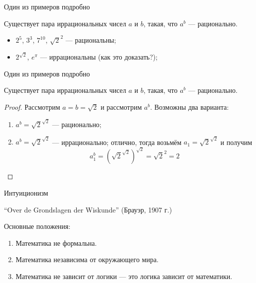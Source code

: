 \documentclass[aspectratio=169]{beamer}
\begin{document}
\begin{frame}{Один из примеров подробно}
\begin{thmrus}Существует пара иррациональных чисел $a$ и $b$,
такая, что $a^b$ — рационально.
\end{thmrus}\pause

\begin{itemize}
\item $2^5$, $3^3$, $7^{10}$, $\sqrt{2}^2$ — рациональны;
\item $2^{\sqrt{2}}$, $e ^ \pi$ — иррациональны (как это доказать?);
\end{itemize}
\end{frame}

\begin{frame}{Один из примеров подробно}
\begin{thmrus}Существует пара иррациональных чисел $a$ и $b$,
такая, что $a^b$ — рационально.
\end{thmrus}

\begin{proof}
Рассмотрим $a = b = \sqrt{2}$ и рассмотрим $a^b$.
Возможны два варианта:

\begin{enumerate}
\item $a^b = \sqrt{2}^{\sqrt{2}}$ — рационально;
\item $a^b = \sqrt{2}^{\sqrt{2}}$ — иррационально; отлично, 
тогда возьмём $a_1 = \sqrt{2}^{\sqrt{2}}$ и получим
$$a_1^b = \left({\sqrt{2}^{\sqrt{2}}}\right)^{\sqrt{2}} = \sqrt{2}^2 = 2$$
\end{enumerate}
\end{proof}

\end{frame}


\begin{frame}{Интуиционизм}

``Over de Grondslagen der Wiskunde'' (Брауэр, 1907 г.)

Основные положения:
\begin{enumerate}
\item Математика не формальна.
\item Математика независима от окружающего мира.
\item Математика не зависит от логики — это логика зависит от математики.
\end{enumerate}


%

\end{frame}
\end{document}
